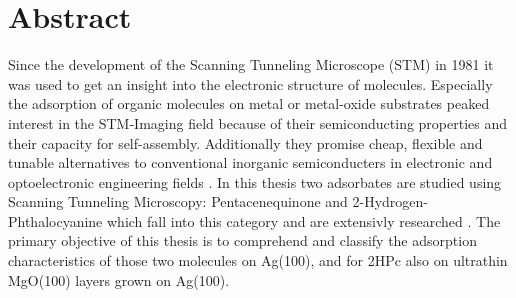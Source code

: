 \chapter*{Abstract}
\label{sec:abstract}
Since the development of the Scanning Tunneling Microscope (STM) in 1981 it was used to get an insight into the electronic structure of molecules. \cite{binnig1982surface}
Especially the adsorption of organic molecules on metal or metal-oxide substrates peaked interest in the STM-Imaging field because of their semiconducting properties and their capacity for self-assembly.
Additionally they promise cheap, flexible and tunable alternatives to conventional inorganic semiconducters in electronic and optoelectronic engineering fields \cite{OTERO2017105}.
In this thesis two adsorbates are studied using Scanning Tunneling Microscopy: Pentacenequinone and 2-Hydrogen-Phthalocyanine which fall into this category and are extensivly researched \cite{wang2012structures}\cite{sperl2011controlled}\cite{thomas1990phthalocyanine}\cite{hollerercharge}.
The primary objective of this thesis is to comprehend and classify the adsorption characteristics of those two molecules on Ag(100), and for 2HPc also on ultrathin MgO(100) layers grown on Ag(100).

 
